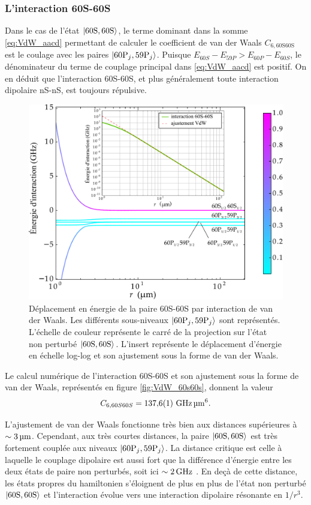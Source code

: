 \subsubsection*{L'interaction 60S-60S}
Dans le cas de l'état $\ket{60\text{S},60\text{S}}$, le terme dominant dans la somme \eqref{eq:VdW_aacd} permettant de calculer le coefficient de van der Waals $C_{6,\text{60S60S}}$ est le coulage avec les paires $\ket{60\text{P}_j,59\text{P}_j}$.
Puisque $E_{60S}-E_{59P}>E_{60P}-E_{60S}$, le dénominateur du terme de couplage principal dans \eqref{eq:VdW_aacd} est positif.
On en déduit que l'interaction 60S-60S, et plus généralement toute interaction dipolaire nS-nS, est toujours répulsive.
%
\begin{figure}[!h]
\centering
\includegraphics[width=0.8\linewidth]{figures/theory/VdW_60S60S}
\caption[Interaction dipolaire 60S-60S]{Déplacement en énergie de la paire 60S-60S par interaction de van der Waals. Les différents sous-niveaux $\ket{60\text{P}_j,59\text{P}_j}$ sont représentés. L'échelle de couleur représente le carré de la projection sur l'état non perturbé $\ket{60\text{S},60\text{S}}$.
L'insert représente le déplacement d'énergie en échelle log-log et son ajustement sous la forme de van der Waals.}
\label{fig:VdW_60s60s}
\end{figure}
%
Le calcul numérique de l'interaction 60S-60S et son ajustement sous la forme de van der Waals, représentés en figure \eqref{fig:VdW_60s60s}, donnent la valeur
\begin{equation}
\label{eq:C660S}
C_{6,60S60S} = \numv{137.6(1)}\si{\giga\hertz\raiseto{6}\micro\meter}.
\end{equation}

L'ajustement de van der Waals fonctionne très bien aux distances supérieures à $\sim\SIvv{3}{ \micro\meter}$.
Cependant, aux très courtes distances, la paire $\ket{60\text{S},60\text{S}}$ est très fortement couplée aux niveaux $\ket{60\text{P}_j,59\text{P}_j}$.
La distance critique est celle à laquelle le couplage dipolaire est aussi fort que la différence d'énergie entre les deux états de paire non perturbés, soit ici $\sim \SIv{2}{\giga\hertz}$.
En deçà de cette distance, les états propres du hamiltonien s'éloignent de plus en plus de l'état non perturbé $\ket{60\text{S},60\text{S}}$ et l'interaction évolue vers une interaction dipolaire résonante en $1/r^3$.

